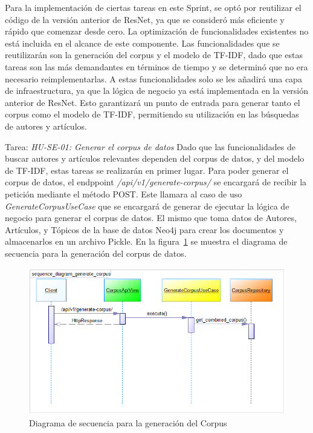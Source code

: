 Para la implementación de ciertas tareas en este Sprint, se optó por reutilizar el código de la versión anterior de ResNet, ya que se consideró más eficiente y rápido que comenzar desde cero.
La optimización de funcionalidades existentes no está incluida en el alcance de este componente.
Las funcionalidades que se reutilizarán son la generación del corpus y el modelo de TF-IDF,
dado que estas tareas son las más demandantes en términos de tiempo y se determinó que no era necesario reimplementarlas.
A estas funcionalidades solo se les añadirá una capa de infraestructura,
ya que la lógica de negocio ya está implementada en la versión anterior de ResNet.
Esto garantizará un punto de entrada para generar tanto el corpus como el modelo de TF-IDF,
permitiendo su utilización en las búsquedas de autores y artículos.

Tarea: \textit{HU-SE-01: Generar el corpus de datos}
Dado que las funcionalidades de buscar autores y artículos relevantes dependen del corpus de datos, y del modelo de TF-IDF, estas tareas se realizarán en primer lugar.
Para poder generar el corpus de datos, el endppoint \textit{/api/v1/generate-corpus/} se encargará de recibir la petición mediante el método POST.
Este llamara al caso de uso \textit{GenerateCorpusUseCase} que se encargará de generar de ejecutar la lógica de negocio para generar el corpus de datos.
El mismo que toma datos de Autores, Artículos, y Tópicos de la base de datos Neo4j para crear los documentos y almacenarlos en un archivo Pickle.
En la figura~\ref{fig:sequence-diagram-generate-corpus} se muestra el diagrama de secuencia para la generación del corpus de datos.

\begin{figure}[H]
    \centering
    \includegraphics[scale=0.8]{../02Figures/02Chapter/Sprints/Sprint-4/sequence_diagram_generate_corpus.png}
    \caption{Diagrama de secuencia para la generación del Corpus}\label{fig:sequence-diagram-generate-corpus}
\end{figure}

